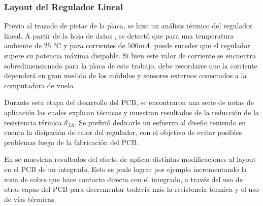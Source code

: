 \subsubsection{Layout del Regulador Lineal}


Previo al trazado de pistas de la placa, se hizo un análisis térmico del regulador lineal. A partir de la hoja de datos \cite{ZLDO1117QG33TA}, se detectó que para una temperatura ambiente de $25$ °C y para corrientes de $500 mA$, puede suceder que el regulador supere su potencia máxima disipable. Si bien este valor de corriente se encuentra sobredimensionado para la placa de este trabajo, debe recordarse que la corriente dependerá en gran medida de los módulos y sensores externos conectados a la computadora de vuelo.


Durante esta etapa del desarrollo del PCB, se encontraron una serie de notas de aplicación las cuales explican técnicas y muestran resultados de la reducción de la resistencia térmica $\theta_{JA}$. Se prefirió dedicarle un esfuerzo al diseño teniendo en cuenta la disipación de calor del regulador, con el objetivo de evitar posibles problemas luego de la fabricación del PCB.

En \cite{ROHM_thermal} se muestran resultados del efecto de aplicar distintas modificaciones al layout en el PCB de un integrado. Esto se pude lograr por ejemplo incrementando la zona de cobre que hace contacto directo con el integrado, a través del uso de otras capas del PCB para decrementar todavía más la resistencia térmica y el uso de vías térmicas.



